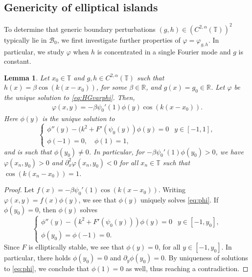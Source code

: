 \documentclass[11pt,reqno]{amsproc}
\newcommand{\R}{\mathbb{R}}
\numberwithin{equation}{section}
\numberwithin{theorem}{section}
\numberwithin{prop}{section}
\numberwithin{cor}{section}
\newtheorem{lemma}{Lemma}
\numberwithin{lemma}{section}
\theoremstyle{remark}
\theoremstyle{definition}
\begin{document}
\subsection{Genericity of elliptical islands} 
To determine that generic boundary perturbations $(g,h)\in (C^{2,\alpha}(\mathbb{T}))^2$ typically lie in $\mathcal{B}_0$, we first investigate further properties of $\varphi=\varphi_{g,h}$. In particular, we study $\varphi$ when $h$ is concentrated in a single Fourier mode and $g$ is constant.

\begin{lemma}\label{lemma:formulavarphihg}
Let $x_0\in \mathbb{T}$ and $g,h\in C^{2,\alpha}(\mathbb{T})$ such that $h(x)=\beta\cos(k(x-x_0))$, for some $\beta\in\R$, and $g(x)=g_0\in \R$. Let $\varphi$ be the unique solution to \eqref{eq:HGvarphi}. Then,
\begin{align*}
\varphi(x,y)= -\beta\psi_0'(1)\phi(y)\cos(k(x-x_0)).
\end{align*}
Here $\phi(y)$ is the unique solution to 
\begin{equation}\label{eq:phi}
\begin{cases}
\phi''(y) - (k^2 + F'(\psi_0(y))\phi(y) = 0 & y\in[-1,1], \\
\phi(-1)= 0, \quad \phi(1)=1,
\end{cases}
\end{equation}
and is such that $\phi(y_0)\neq 0$. In particular, for $-\beta\psi_0'(1)\phi(y_0)>0$, we have $\varphi(x_n,y_0)>0$ and $\partial_x^2\varphi(x_n,y_0) < 0$ for all $x_n\in\mathbb{T}$ such that $\cos(k(x_n-x_0))=1$. 
\end{lemma}

\begin{proof}
Let $f(x) = -\beta\psi_0'(1)\cos(k(x-x_0))$. Writing $\varphi(x,y) = f(x)\phi(y)$, we see that $\phi(y)$ uniquely solves \eqref{eq:phi}. If $\phi(y_0)=0$, then $\phi(y)$ solves
\begin{equation}
\begin{cases}
\phi''(y) - (k^2+F'(\psi_0(y)))\phi(y) = 0 & y\in[-1,y_0], \\
\phi(y_0)= \phi(-1)=0. & 
\end{cases}
\end{equation}
Since $F$ is elliptically stable, we see that $\phi(y) = 0$, for all $y\in [-1,y_0]$. In particular, there holds $\phi(y_0)=0$ and $\partial_y\phi(y_0)=0$. By uniqueness of solutions to  \eqref{eq:phi}, we conclude that $\phi(1)=0$ as well, thus reaching a contradiction. 
\end{proof}
\end{document}
